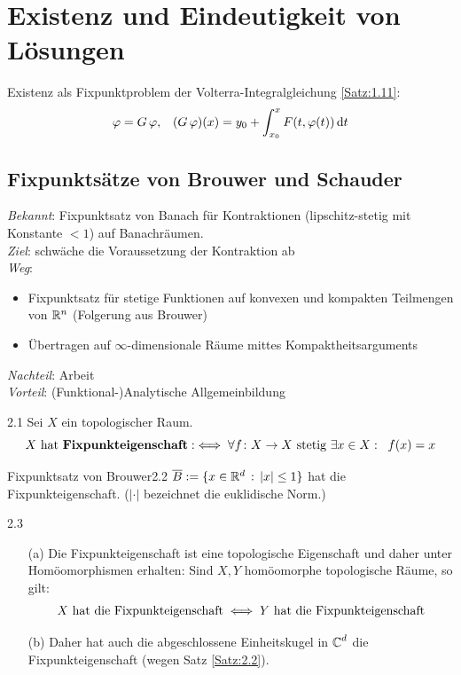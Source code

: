 \documentclass[a4paper]{article}
\begin{document}
\section{Existenz und Eindeutigkeit von Lösungen}
Existenz als Fixpunktproblem der Volterra-Integralgleichung \ref{Satz:1.11}:
\[\operatorname{\varphi}=G\operatorname{\varphi},\;\;\;(G\operatorname{\varphi})(x)=y_0+\int_{x_0}^xF(t,\operatorname{\varphi}(t))\mathop{}\!\mathrm{d} t\]
\subsection{Fixpunktsätze von Brouwer und Schauder}
\textit{Bekannt}: Fixpunktsatz von Banach für Kontraktionen (lipschitz-stetig mit Konstante $<1$) auf Banachräumen.\\
\textit{Ziel}: schwäche die Voraussetzung der Kontraktion ab\\
\textit{Weg}:\begin{itemize}
\item Fixpunktsatz für stetige Funktionen auf konvexen und kompakten Teilmengen von $\mathbb R^n$ (Folgerung aus Brouwer)
\item Übertragen auf $\infty$-dimensionale Räume mittes Kompaktheitsarguments
\end{itemize}
\textit{Nachteil}: Arbeit\\
\textit{Vorteil}: (Funktional-)Analytische Allgemeinbildung

\begin{Def}{}{2.1}
Sei $X$ ein topologischer Raum. 
\[X\text{ hat \textbf{Fixpunkteigenschaft}}:\iff \forall f\colon X\to X\text{ stetig }\exists x\in X:\;\; f(x)=x\]
\end{Def}

\begin{Satz}{Fixpunktsatz von Brouwer}{2.2}
$\overline{B}:=\{x\in\mathbb R^d\,:\,|x|\le 1\}$ hat die Fixpunkteigenschaft. ($|\cdot|$ bezeichnet die euklidische Norm.)
\end{Satz}

\begin{Bemerkung}{}{2.3}
\begin{itemize}
\item[(a)] Die Fixpunkteigenschaft ist eine topologische Eigenschaft und daher unter Homöomorphismen erhalten: Sind $X,Y$ homöomorphe topologische Räume, so gilt:
\[X\text{ hat die Fixpunkteigenschaft}\iff Y\text{ hat die Fixpunkteigenschaft}\]
\item[(b)] Daher hat auch die abgeschlossene Einheitskugel in $\operatorname{\mathbb C}^d$ die Fixpunkteigenschaft (wegen Satz \ref{Satz:2.2}).
\end{itemize}
\end{Bemerkung}
\end{document}
